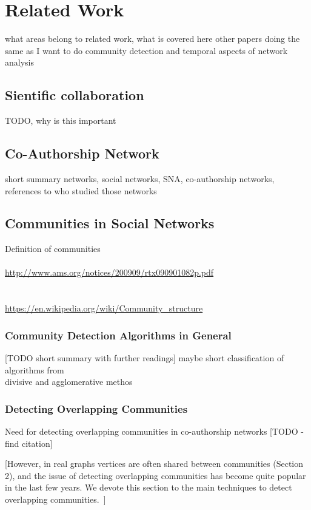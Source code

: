 \documentclass[runningheads,a4paper]{llncs}
\begin{document}
\section{Related Work}
what areas belong to related work, what is covered here
other papers doing the same as I want to do
community detection and temporal aspects of network analysis

\subsection{Sientific collaboration}
TODO, why is this important

\subsection{Co-Authorship Network}
short summary networks, social networks, SNA, co-authorship networks, references to who studied those networks

\subsection{Communities in Social Networks}
Definition of communities\\
\cite{girvan2002community}\\
\url{http://www.ams.org/notices/200909/rtx090901082p.pdf}\\
\cite{palla2005uncovering}\\
\cite{fortunato2010community}\\
\url{https://en.wikipedia.org/wiki/Community_structure}

\subsubsection{Community Detection Algorithms in General}
[TODO short summary with further readings]
maybe short classification of algorithms from~\cite{fortunato2010community}\\
divisive and agglomerative methos\\

\subsubsection{Detecting Overlapping Communities}
Need for detecting overlapping communities in co-authorship networks [TODO - find citation]

[However, in real graphs vertices are often shared between communities (Section 2), and the issue of detecting overlapping communities has become quite popular in the last few years. We devote this section to the main techniques to detect overlapping communities.~\cite{fortunato2010community}]
\end{document}
